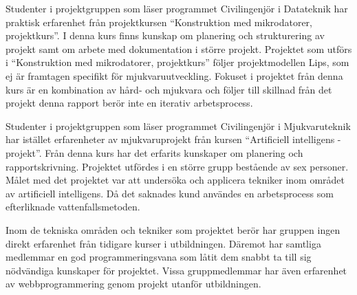 Studenter i projektgruppen som läser programmet Civilingenjör i Datateknik har praktisk erfarenhet från projektkursen ``Konstruktion med mikrodatorer, projektkurs''.\cite{tsea29} I denna kurs finns kunskap om planering och strukturering av projekt samt om arbete med dokumentation i större projekt. Projektet som utförs i ``Konstruktion med mikrodatorer, projektkurs'' följer projektmodellen Lips\cite{lips}, som ej är framtagen specifikt för mjukvaruutveckling. Fokuset i projektet från denna kurs är en kombination av hård- och mjukvara och följer till skillnad från det projekt denna rapport berör inte en iterativ arbetsprocess.

Studenter i projektgruppen som läser programmet Civilingenjör i Mjukvaruteknik har istället erfarenheter av mjukvaruprojekt från kursen ``Artificiell intelligens - projekt''.\cite{tddd92} Från denna kurs har det erfarits kunskaper om planering och rapportskrivning. Projektet utfördes i en större grupp bestående av sex personer. Målet med det projektet var att undersöka och applicera tekniker inom området av artificiell intelligens. Då det saknades kund användes en arbetsprocess som efterliknade vattenfallsmetoden.

Inom de tekniska områden och tekniker som projektet berör har gruppen ingen direkt erfarenhet från tidigare kurser i utbildningen. Däremot har samtliga medlemmar en god programmeringsvana som låtit dem snabbt ta till sig nödvändiga kunskaper för projektet. Vissa gruppmedlemmar har även erfarenhet av webbprogrammering genom projekt utanför utbildningen.
